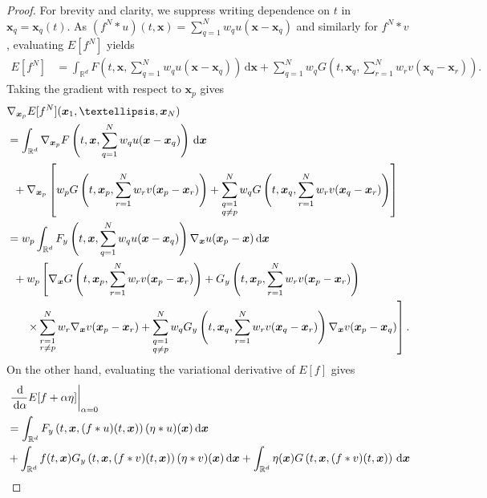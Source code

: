 \documentclass[10pt,a4paper]{amsart}
\newcommand{\bbx}{\bm x}
\newcommand{\rd}{\,\mathrm{d}}
\begin{document}
\begin{proof}
For brevity and clarity, we suppress writing dependence on $t$ in $\bm x_q=\bm x_q(t)$. As $(f^N*u)(t,\bm x)=\displaystyle\sum_{q=1}^N w_q u(\bm x-\bm x_q)$ and similarly for $f^N*v$, evaluating $E[f^N]$ yields
    \begin{align*}
        E[f^N] &= \int_{\mathbb{R}^d} F\left(t,\bm x, \sum_{q=1}^N w_q u(\bm x-\bm x_q)\right) \rd\bm x+\sum_{q=1}^N w_q G\left(t,\bm x_q, \sum_{r=1}^N w_r v(\bm x_q-\bm x_r)\right).
    \end{align*} Taking the gradient with respect to $\bm x_p$ gives
        \begin{align}
        \label{eq:LHS-compCond}&\nabla_{\bm x_p} E[f^N](\bm x_1,\dots,\bm x_N)\\
        &=\int_{\mathbb{R}^d} \nabla_{\bm x_p} F\left(t,\bm x, \sum_{q=1}^N w_q u(\bm x-\bm x_q)\right)\rd\bm x \nonumber\\
        &\hskip 2mm+ \nabla_{\bm x_p}\left[w_p G\left(t,\bm x_p,\sum_{r=1}^N w_r v(\bm x_p-\bm x_r)\right)+\sum_{\substack{q=1\\ q\neq p}}^N w_q G\left(t,\bm x_q,\sum_{r=1}^N w_r v(\bm x_q-\bm x_r)\right)\right] \nonumber\\
        &=w_p\int_{\mathbb{R}^d} F_y\left(t,\bm x, \sum_{q=1}^N w_q u(\bm x-\bm x_q)\right) \nabla_{\bbx} u(\bm x_p-\bm x)\rd\bm x\nonumber\\
        &\hskip 2mm+ w_p\left[\nabla_{\bbx}G\left(t,\bm x_p,\sum_{r=1}^N w_r v(\bm x_p-\bm x_r)\right) +G_y\left(t,\bm x_p,\sum_{r=1}^N w_r v(\bm x_p-\bm x_r)\right) \right.\nonumber\\
        &\hskip 6mm \left.\times\sum_{\substack{r=1\\r\neq p}}^N w_r \nabla_{\bbx} v(\bm x_p-\bm x_r) +\sum_{\substack{q=1\\q\neq p}}^N w_qG_y\left(t,\bm x_q,\sum_{r=1}^N w_r v(\bm x_q-\bm x_r)\right) \nabla_{\bbx} v(\bm x_p-\bm x_q)\right].
        \nonumber
    \end{align}
    On the other hand, evaluating the variational derivative of $E[f]$ gives  \begin{align*}
       &\left.\frac{\rd}{\rd\alpha} E[f+\alpha \eta]\right|_{\alpha =0}\\
        &= \int_{\mathbb{R}^d} F_y\left(t, \bm x, (f*u)(t,\bm x)\right)(\eta*u)(\bm x) \rd\bm x\\
        &\hskip 0mm+\int_{\mathbb{R}^d} f(t,\bm x)G_y\left(t, \bm x, (f*v)(t,\bm x)\right)(\eta*v)(\bm x) \rd\bm x + \int_{\mathbb{R}^d} \eta(\bm x)G\left(t,\bm x,(f*v)(t,\bm x)\right) \rd\bm x\\

\end{align*}
\end{proof}
\end{document}
